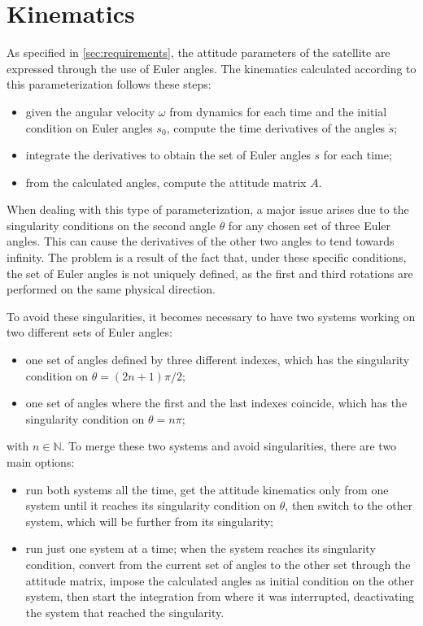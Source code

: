 \section{Kinematics}
\label{sec:kinematics}

As specified in \autoref{sec:requirements}, the attitude parameters of the satellite are expressed through the use of Euler angles. The kinematics calculated according to this parameterization follows these steps:

\begin{itemize}[wide,itemsep=3pt,topsep=3pt]
    \item given the angular velocity $\omega$ from dynamics for each time and the initial condition on Euler angles $s_0$, compute the time derivatives of the angles $\dot{s}$;
    \item integrate the derivatives to obtain the set of Euler angles $s$ for each time;
    \item from the calculated angles, compute the attitude matrix $A$.
\end{itemize}

When dealing with this type of parameterization, a major issue arises due to the singularity conditions on the second angle $\theta$ for any chosen set of three Euler angles. This can cause the derivatives of the other two angles to tend towards infinity. The problem is a result of the fact that, under these specific conditions, the set of Euler angles is not uniquely defined, as the first and third rotations are performed on the same physical direction.

To avoid these singularities, it becomes necessary to have two systems working on two different sets of Euler angles:

\begin{itemize}[wide,itemsep=3pt,topsep=3pt]
    \item one set of angles defined by three different indexes, which has the singularity condition on $\theta = (2n+1) \pi / 2$;
    \item one set of angles where the first and the last indexes coincide, which has the singularity condition on $\theta = n \pi$;
\end{itemize}

with $n \in \mathbb{N}$. To merge these two systems and avoid singularities, there are two main options:

\begin{itemize}[wide,itemsep=3pt,topsep=3pt]
    \item run both systems all the time, get the attitude kinematics only from one system until it reaches its singularity condition on $\theta$, then switch to the other system, which will be further from its singularity;
    \item run just one system at a time; when the system reaches its singularity condition, convert from the current set of angles to the other set through the attitude matrix, impose the calculated angles as initial condition on the other system, then start the integration from where it was interrupted, deactivating the system that reached the singularity.
\end{itemize}

